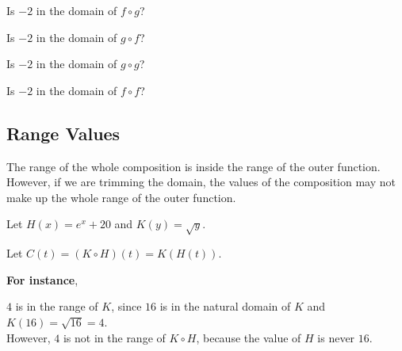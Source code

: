 \documentclass{ximera}
\begin{document}
\begin{question}

Is $-2$ in the domain of $f \circ g$?

\begin{multipleChoice}
\end{multipleChoice}


Is $-2$ in the domain of $g \circ f$?

\begin{multipleChoice}
\end{multipleChoice}



Is $-2$ in the domain of $g \circ g$?

\begin{multipleChoice}
\end{multipleChoice}


Is $-2$ in the domain of $f \circ f$?

\begin{multipleChoice}
\end{multipleChoice}




\end{question}




\subsection*{Range Values}

The range of the whole composition is inside the range of the outer function.  However, if we are trimming the domain, the values of the composition may not make up the whole range of the outer function.






Let $H(x) = e^x + 20$ and $K(y) = \sqrt{y}$. 

Let $C(t) = (K \circ H)(t) = K(H(t))$. 




\textbf{For instance},

$4$ is in the range of $K$, since $16$ is in the natural domain of $K$ and $K(16) = \sqrt{16} = 4$. \\

However, $4$ is not in the range of $K \circ H$, because the value of $H$ is never $16$. 
\end{document}

